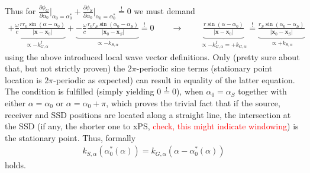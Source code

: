 \documentclass[a4paper,BCOR=15mm,10pt,twoside]{scrartcl}
\newcommand{\fscom}[2][red]{\textcolor{#1}{#2}}  %
\newcommand\wc{\frac{\omega}{c}}  %
\newcommand\azx{\alpha}  %
\renewcommand{\vec}[1]{\mathbf{#1}}  %
\begin{document}
Thus for $\frac{\partial \phi_G}{\partial \azx_0}\big|_{\azx_0=\azx_0^*} + \frac{\partial \phi_S}{\partial \azx_0}\big|_{\azx_0=\azx_0^*} \stackrel{!}{=} 0$ we must demand
\begin{align}
\underbrace{+\wc \frac{r r_0 \sin(\azx-\azx_0)}{|\vec{x} -\vec{x}_0|}}_{\propto -k_{G,\azx}^I} + \underbrace{-\wc \frac{r_0 r_S \sin(\azx_0 - \azx_S)}{|\vec{x}_0 - \vec{x}_S|}}_{\propto -k_{S,\azx}} \stackrel{!}{=} 0\qquad\rightarrow\qquad
\underbrace{\frac{r \sin(\azx-\azx_0)}{|\vec{x} -\vec{x}_0|}}_{\propto -k_{G,\azx}^I = +k_{G,\azx}} \stackrel{!}{=} \underbrace{\frac{r_S \sin(\azx_0 - \azx_S)}{|\vec{x}_0 - \vec{x}_S|}}_{\propto +k_{S,\azx}}
\end{align}
using the above introduced local wave vector definitions.
Only (pretty sure about that, but not strictly proven) the $2\pi$-periodic sine terms (stationary point location is $2\pi$-periodic as expected) can result in equality of the latter equation.
The condition is fulfilled (simply yielding $0 \stackrel{!}{=} 0$), when $\azx_0 = \azx_S$ together with either $\azx = \azx_0$ or $\azx = \azx_0 + \pi$, which proves the trivial fact that if the source, receiver and SSD positions are located along a straight line, the intersection at the SSD (if any, the shorter one to xPS, \fscom{check, this might indicate windowing}) is the stationary point. 
Thus, formally 
\begin{align}
\label{eq:SPA_condition_azx}
k_{S,\azx}(\azx_0^*(\azx)) = k_{G,\azx}(\azx - \azx_0^*(\azx))
\end{align}
holds.
\end{document}
